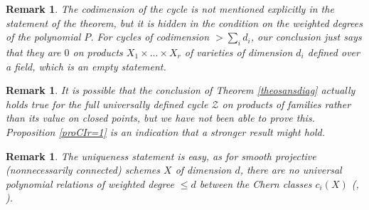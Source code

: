 \documentclass[10pt]{article}
\newtheorem{rema}[theo]{Remark}
\begin{document}
\begin{rema}\label{remasurledeg} {\rm The codimension of the cycle is not mentioned explicitly in the statement
of the theorem, but it is hidden in the  condition on the weighted degrees of the polynomial $P$.
For cycles of codimension $>\sum_i d_i$, our conclusion just says that they are $0$ on products
$X_1\times\ldots\times X_r$ of varieties of dimension $d_i$ defined over a field, which is an empty statement.}
\end{rema}
\begin{rema}{\rm  It is possible that the conclusion of Theorem \ref{theosansdiag}  actually holds true for the full universally defined cycle
$\mathcal{Z}$ on products of families rather than its value on closed points, but we have not been able to prove this. Proposition \ref{proCIr=1} is an indication that a stronger result might hold.
}
\end{rema}
\begin{rema}{\rm  The uniqueness statement is easy, as for smooth projective (nonnecessarily connected) schemes
 $X$ of dimension $d$, there
are no} universal {\rm polynomial  relations of weighted  degree $\leq d$ between the Chern classes
$c_i(X)$  (\cite{milnor}, \cite{thom}).
}
\end{rema}
\end{document}
